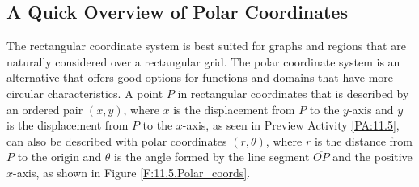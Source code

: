 

\subsection*{A Quick Overview of Polar Coordinates}

The rectangular coordinate system is best suited for graphs and regions that are naturally considered over a rectangular grid. The polar coordinate system is an alternative that offers good options for functions and domains that have more circular characteristics.  A point $P$ in rectangular coordinates that is described by an ordered pair $(x,y)$, where $x$ is the displacement from $P$ to the $y$-axis and $y$ is the displacement from $P$ to the $x$-axis, as seen in Preview Activity \ref{PA:11.5}, can also be described  with polar coordinates $(r,\theta)$, where $r$ is the distance from $P$ to the origin and $\theta$ is the angle formed by the line segment $\overline{OP}$ and the positive $x$-axis, as shown in Figure \ref{F:11.5.Polar_coords}.
